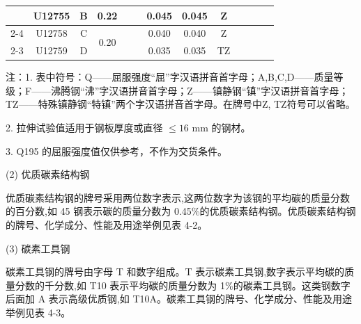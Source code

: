 \documentclass[UTF8]{ctexbook}
\newcommand{\◎}{\ensuremath{\bigcirc}}
\begin{document}
\begin{table}[H]
\begin{tabular}{|c|c|c|c|c|c|c|c|c|c|c|c|c|}
 & U12755 & B & 0.22 & & & 0.045 & 0.045 & Z & & & & \\
\cline{2-4}\cline{7-9}
 & U12758 & C & \multirow{2}{*}{0.20} & & & 0.040 & 0.040 & Z & & & & \\
\cline{2-3}\cline{7-9}
 & U12759 & D & & & & 0.035 & 0.035 & TZ & & & & \\
\hline
\end{tabular}
\begin{tablenotes}
	\item 注：1. 表中符号：Q——屈服强度“屈”字汉语拼音首字母；A,B,C,D——质量等级；F——沸腾钢“沸”字汉语拼音首字母；Z——镇静钢“镇”字汉语拼音首字母；TZ——特殊镇静钢“特镇”两个字汉语拼音首字母。在牌号中Z, TZ符号可以省略。
	\item 2. 拉伸试验值适用于钢板厚度或直径 $\le 16$ mm 的钢材。
	\item 3. Q195 的屈服强度值仅供参考，不作为交货条件。
\end{tablenotes}
\end{table}

(2) 优质碳素结构钢

优质碳素结构钢的牌号采用两位数字表示,这两位数字为该钢的平均碳的质量分数的百分数,如 45 钢表示碳的质量分数为 0.45\%的优质碳素结构钢。优质碳素结构钢的牌号、化学成分、性能及用途举例见表 4-2。

(3) 碳素工具钢

碳素工具钢的牌号由字母 T 和数字组成。T 表示碳素工具钢,数字表示平均碳的质量分数的千分数,如 T10 表示平均碳的质量分数为 1\%的碳素工具钢。这类钢数字后面加 A 表示高级优质钢,如 T10A。碳素工具钢的牌号、化学成分、性能及用途举例见表 4-3。
\end{document}
